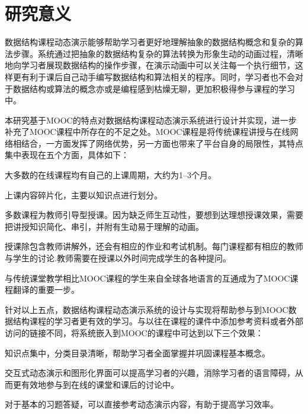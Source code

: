 \section{研究意义}
\begin{sectext}
数据结构课程动态演示能够帮助学习者更好地理解抽象的数据结构概念和复杂的算法步骤。系统通过把抽象的数据结构复杂的算法转换为形象生动的动画过程，清晰地向学习者展现数据结构的操作步骤，在演示动画中可以关注每一个执行细节，这样更有利于课后自己动手编写数据结构和算法相关的程序。同时，学习者也不会对于数据结构或算法的概念亦或是编程感到枯燥无聊，更加积极得参与课程的学习中。

本研究基于MOOC的特点对数据结构课程动态演示系统进行设计并实现，进一步补充了MOOC课程中所存在的不足之处。MOOC课程是将传统课程讲授与在线网络相结合，一方面发挥了网络优势，另一方面也带来了平台自身的局限性，其特点集中表现在五个方面，具体如下：
\begin{itemlist}
\item 大多数的在线课程均有自己的上课周期，大约为1--3个月。
\item 上课内容碎片化，主要以知识点进行划分。
\item 多数课程为教师引导型授课。因为缺乏师生互动性，要想到达理想授课效果，需要把讲授知识简化、串引，并附有生动易于理解的动画。
\item 授课除包含教师讲解外，还会有相应的作业和考试机制。每门课程都有相应的教师与学生的讨论.教师需要在授课以外时间完成学生的各种提问。
\item 与传统课堂教学相比MOOC课程的学生来自全球各地语言的互通成为了MOOC课程翻译的重要一步。
\end{itemlist}

针对以上五点，数据结构课程动态演示系统的设计与实现将帮助参与到MOOC数据结构课程的学习者更有效的学习。与以往在课程的课件中添加参考资料或者外部访问的链接不同，将系统嵌入到MOOC的课程中可达到以下三个效果：
\begin{itemlist}
\item 知识点集中，分类目录清晰，帮助学习者全面掌握并巩固课程基本概念。
\item 交互式动态演示和图形化界面可以提高学习者的兴趣，消除学习者的语言障碍，从而更有效地参与到在线的课堂和课后的讨论中。
\item 对于基本的习题答疑，可以直接参考动态演示内容，有助于提高学习效率。
\end{itemlist}
\end{sectext}

